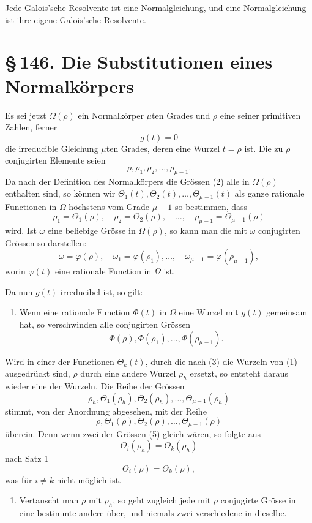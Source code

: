 \documentclass[11pt]{article}
\providecommand{\sect}[2]{\section*{\S\,#1. #2}}
\begin{document}
Jede Galois'sche Resolvente ist eine Normalgleichung, und eine Normalgleichung ist ihre eigene Galois'sche Resolvente.

\sect{146}{Die Substitutionen eines Normalkörpers}

Es sei jetzt $\Omega(\rho)$ ein Normalkörper $\mu$ten Grades und $\rho$ eine seiner primitiven Zahlen, ferner
\[
\tag{1}
        g(t)=0
\]
die irreducible Gleichung $\mu$ten Grades, deren eine Wurzel $t=\rho$ ist. Die zu $\rho$ conjugirten Elemente seien
\[
\tag{2}
        \rho,\rho_1,\rho_2,\ldots,\rho_{\mu-1}.
\]
Da nach der Definition des Normalkörpers die Grössen (2) alle in $\Omega(\rho)$ enthalten sind, so können wir $\Theta_1(t),\Theta_2(t),\ldots,\Theta_{\mu-1}(t)$ als ganze rationale Functionen in $\Omega$ höchstens vom Grade $\mu-1$ so bestimmen, dass
\[
\tag{3}
        \rho_1=\Theta_1(\rho),\quad
        \rho_2=\Theta_2(\rho),\quad\ldots,\quad
        \rho_{\mu-1}=\Theta_{\mu-1}(\rho)
\]
wird. Ist $\omega$ eine beliebige Grösse in $\Omega(\rho)$, so kann man die mit $\omega$ conjugirten Grössen so darstellen:
\[
\tag{4}
        \omega=\varphi(\rho),\quad
        \omega_1=\varphi(\rho_1),\ldots,\quad
        \omega_{\mu-1}=\varphi(\rho_{\mu-1}),
\]
worin $\varphi(t)$ eine rationale Function in $\Omega$ ist.

Da nun $g(t)$ irreducibel ist, so gilt:
\begin{enumerate}[label=\arabic*.,leftmargin=2em]
\item Wenn eine rationale Function $\Phi(t)$ in $\Omega$ eine Wurzel mit $g(t)$ gemeinsam hat, so verschwinden alle conjugirten Grössen
\[
        \Phi(\rho),\Phi(\rho_1),\ldots,\Phi(\rho_{\mu-1}).
\]
\end{enumerate}

Wird in einer der Functionen $\Theta_k(t)$, durch die nach (3) die Wurzeln von (1) ausgedrückt sind, $\rho$ durch eine andere Wurzel $\rho_h$ ersetzt, so entsteht daraus wieder eine der Wurzeln. Die Reihe der Grössen
\[
\tag{5}
        \rho_h,\Theta_1(\rho_h),\Theta_2(\rho_h),\ldots,\Theta_{\mu-1}(\rho_h)
\]
stimmt, von der Anordnung abgesehen, mit der Reihe
\[
\tag{6}
        \rho,\Theta_1(\rho),\Theta_2(\rho),\ldots,\Theta_{\mu-1}(\rho)
\]
überein. Denn wenn zwei der Grössen (5) gleich wären, so folgte aus
\[
\tag{7}
        \Theta_i(\rho_h)=\Theta_k(\rho_h)
\]
nach Satz 1
\[
\tag{8}
        \Theta_i(\rho)=\Theta_k(\rho),
\]
was für $i\ne k$ nicht möglich ist.

\begin{enumerate}[label=\arabic*.,leftmargin=2em,start=2]
\item Vertauscht man $\rho$ mit $\rho_h$, so geht zugleich jede mit $\rho$ conjugirte Grösse in eine bestimmte andere über, und niemals zwei verschiedene in dieselbe.
\end{enumerate}
\end{document}

